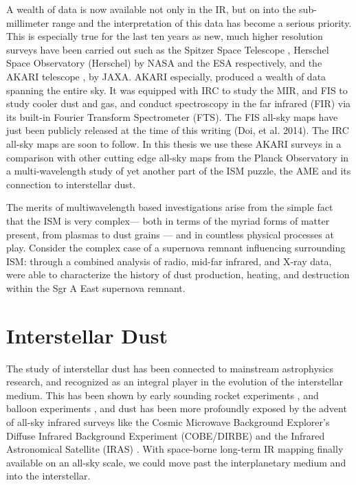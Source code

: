     A wealth of data is now available not only in the IR, but on into the sub-millimeter range and the interpretation of this data has become a serious priority. This is especially true for the last ten years as new, much higher resolution surveys have been carried out such as the Spitzer Space Telescope \cite{spitzer04}, Herschel Space Observatory (Herschel) \citep{herschel10} by NASA and the ESA respectively, and the AKARI telescope \citep{akari07},  by JAXA. AKARI especially, produced a wealth of data spanning the entire sky. It was equipped with IRC \citep{irc07} to study the MIR, and FIS \citep{fis07} to study cooler dust and gas, and conduct spectroscopy in the far infrared (FIR) via its built-in Fourier Transform Spectrometer (FTS). The FIS all-sky maps have just been publicly released at the time of this writing (Doi, et al. 2014). The IRC all-sky maps are soon to follow. In this thesis we use these AKARI surveys in a comparison with other cutting edge all-sky maps from the Planck Observatory in a multi-wavelength study of yet another part of the ISM puzzle, the AME and its connection to interstellar dust.

    The merits of multiwavelength based investigations arise from the simple fact that the ISM is very complex--- both in terms of the myriad forms of matter present, from plasmas to dust grains --- and in countless physical processes at play. Consider the complex case of a supernova remnant influencing surrounding ISM: through a combined analysis of radio, mid-far infrared, and X-ray data, \cite{lau15} were able to characterize the history of dust production, heating, and destruction within the Sgr A East supernova remnant.


\section{Interstellar Dust}

    The study of interstellar dust has been connected to mainstream astrophysics research, and recognized as an integral player in the evolution of the interstellar medium. This has been shown by early sounding rocket experiments \citep{wolstencroft67,soifer71}, and balloon experiments \citep{muehlner70,emerson73}, and dust has been more profoundly exposed by the advent of all-sky infrared surveys like the  Cosmic Microwave Background Explorer's Diffuse Infrared Background Experiment (COBE/DIRBE) \citep{sodroski94} and the Infrared Astronomical Satellite (IRAS) \citep{iras84}.
    With space-borne long-term IR mapping finally available on an all-sky scale, we could move past the interplanetary medium and into the interstellar.

